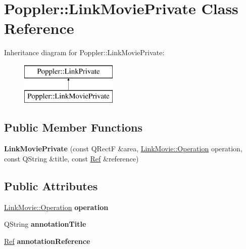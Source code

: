 \hypertarget{class_poppler_1_1_link_movie_private}{}\section{Poppler\+:\+:Link\+Movie\+Private Class Reference}
\label{class_poppler_1_1_link_movie_private}
Inheritance diagram for Poppler\+:\+:Link\+Movie\+Private\+:\begin{figure}[H]
\begin{center}
\leavevmode
\includegraphics[height=2.000000cm]{class_poppler_1_1_link_movie_private}
\end{center}
\end{figure}
\subsection*{Public Member Functions}
\begin{DoxyCompactItemize}
\item 
\mbox{\label{class_poppler_1_1_link_movie_private_a6af2935f0005c3148445503233b44213}} 
{\bfseries Link\+Movie\+Private} (const Q\+RectF \&area, \hyperlink{class_poppler_1_1_link_movie_a66b83ca2658b31b448e4b4696cb452ba}{Link\+Movie\+::\+Operation} operation, const Q\+String \&title, const \hyperlink{struct_ref}{Ref} \&reference)
\end{DoxyCompactItemize}
\subsection*{Public Attributes}
\begin{DoxyCompactItemize}
\item 
\mbox{\label{class_poppler_1_1_link_movie_private_a08f72210b7da9f1726e65271624157b9}} 
\hyperlink{class_poppler_1_1_link_movie_a66b83ca2658b31b448e4b4696cb452ba}{Link\+Movie\+::\+Operation} {\bfseries operation}
\item 
\mbox{\label{class_poppler_1_1_link_movie_private_abf2367a4f6054b2755da735aeeb3cc87}} 
Q\+String {\bfseries annotation\+Title}
\item 
\mbox{\label{class_poppler_1_1_link_movie_private_ae8651735cbbcb7fbcfef9f2a3e1423dd}} 
\hyperlink{struct_ref}{Ref} {\bfseries annotation\+Reference}
\end{DoxyCompactItemize}


